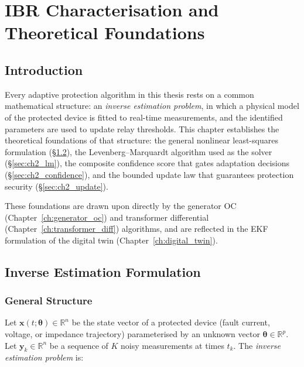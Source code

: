 \chapter{IBR Characterisation and Theoretical Foundations}
\label{ch:foundations}
\label{ch:ibr_char}

\section{Introduction}
\label{sec:ch2_intro}

Every adaptive protection algorithm in this thesis rests on a common
mathematical structure: an \emph{inverse estimation problem}, in which
a physical model of the protected device is fitted to real-time measurements,
and the identified parameters are used to update relay thresholds. This
chapter establishes the theoretical foundations of that structure:
the general nonlinear least-squares formulation (\S\ref{sec:ch2_lsq}),
the Levenberg--Marquardt algorithm used as the solver
(\S\ref{sec:ch2_lm}), the composite confidence score that gates adaptation
decisions (\S\ref{sec:ch2_confidence}), and the bounded update law that
guarantees protection security (\S\ref{sec:ch2_update}).

These foundations are drawn upon directly by the generator OC
(Chapter~\ref{ch:generator_oc}) and transformer differential
(Chapter~\ref{ch:transformer_diff}) algorithms, and are reflected in
the EKF formulation of the digital twin (Chapter~\ref{ch:digital_twin}).

\section{Inverse Estimation Formulation}
\label{sec:ch2_lsq}

\subsection{General Structure}

Let $\mathbf{x}(t; \bm{\theta}) \in \mathbb{R}^n$ be the state vector
of a protected device (fault current, voltage, or impedance trajectory)
parameterised by an unknown vector $\bm{\theta} \in \mathbb{R}^p$.
Let $\mathbf{y}_k \in \mathbb{R}^n$ be a sequence of $K$ noisy measurements
at times $t_k$. The \emph{inverse estimation problem} is:

